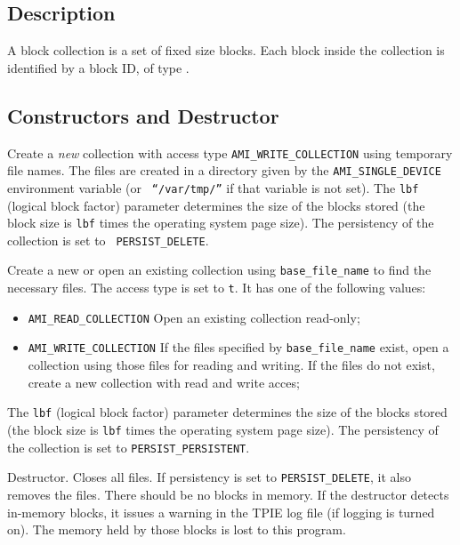 \subsection{Description}

A block collection is a set of fixed size blocks. Each block inside the
collection is identified by a block ID, of type .

\subsection{Constructors and Destructor}

   \btabb
	
	 {Create a {\em new}
	collection with access type {\tt AMI\_WRITE\_COLLECTION} using
	temporary file names. The files are created in a directory given by
	the {\tt AMI\_SINGLE\_DEVICE} environment variable (or {\tt
	``/var/tmp/''} if that variable is not set).  The {\tt lbf}
	(logical block factor) parameter determines the size of the blocks
	stored (the block size is {\tt lbf} times the operating system
	page size). The persistency of the collection is set to {\tt
	PERSIST\_DELETE}.}

	 {Create a new or open an 
	existing collection using {\tt base\_file\_name} to find the
	necessary files. The access type is set to {\tt t}. It has one of
	the following values:
	\begin{itemize} 
          \item[]{\tt AMI\_READ\_COLLECTION} Open an existing collection
          read-only;
          \item[]{\tt AMI\_WRITE\_COLLECTION} If the files specified by
          {\tt base\_file\_name} exist, open a collection using those files
          for reading and writing. If the files do not exist, create a new
          collection with read and write acces;
	\end{itemize}
        The {\tt lbf} (logical block factor) parameter determines the size
        of the blocks stored (the block size is {\tt lbf} times the
        operating system page size). The persistency of the collection is
        set to {\tt PERSIST\_PERSISTENT}.}

       {Destructor.
      Closes all files. If persistency is set to {\tt PERSIST\_DELETE}, it
      also removes the files. There should be no blocks in memory. If the
      destructor detects in-memory blocks, it issues a warning in the TPIE
      log file (if logging is turned on). The memory held by those blocks
      is lost to this program.}


